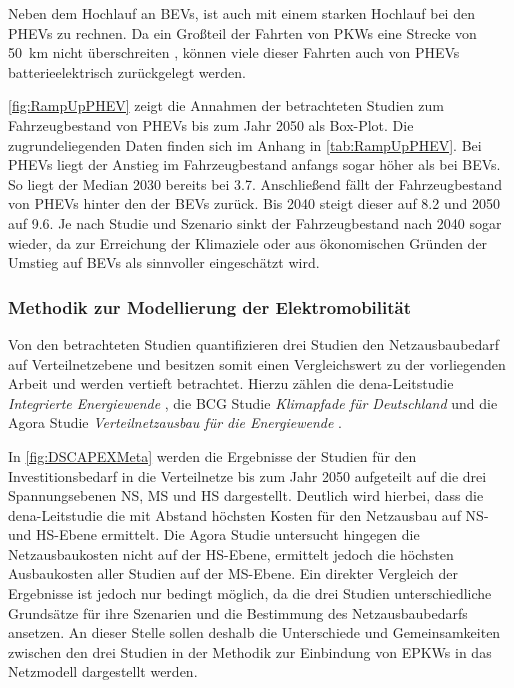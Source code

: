 Neben dem Hochlauf an \glspl{BEV}, ist auch mit einem starken Hochlauf bei den \glspl{PHEV} zu rechnen.
Da ein Großteil der Fahrten von \glspl{PKW} eine Strecke von \SI{50}{\km} nicht überschreiten \cite{Agora2019}, können viele dieser Fahrten auch von \glspl{PHEV} batterieelektrisch zurückgelegt werden.



\autoref{fig:RampUpPHEV} zeigt die Annahmen der betrachteten Studien zum Fahrzeugbestand von \glspl{PHEV} bis zum Jahr \num{2050} als Box-Plot.
Die zugrundeliegenden Daten finden sich im Anhang in \autoref{tab:RampUpPHEV}.
Bei \glspl{PHEV} liegt der Anstieg im Fahrzeugbestand anfangs sogar höher als bei \glspl{BEV}.
So liegt der Median 2030 bereits bei \SI{3.7}{\MioFZs}.
Anschließend fällt der Fahrzeugbestand von \glspl{PHEV} hinter den der \glspl{BEV} zurück.
Bis \num{2040} steigt dieser auf \SI{8.2}{\Mio} und \num{2050} auf \SI{9.6}{\MioStk}.
Je nach Studie und Szenario sinkt der Fahrzeugbestand nach \num{2040} sogar wieder, da zur Erreichung der Klimaziele oder aus ökonomischen Gründen der Umstieg auf \glspl{BEV} als sinnvoller eingeschätzt wird.


\subsubsection{Methodik zur Modellierung der Elektromobilität}

Von den betrachteten Studien quantifizieren drei Studien den Netzausbaubedarf auf Verteilnetzebene und besitzen somit einen Vergleichswert zu der vorliegenden Arbeit und werden vertieft betrachtet.
Hierzu zählen die dena-Leitstudie \textit{Integrierte Energiewende} \cite{DEAGH2018}, die BCG Studie \textit{Klimapfade für Deutschland} \cite{BCG2018} und die Agora Studie \textit{Verteilnetzausbau für die Energiewende} \cite{Agora2019}.



In \autoref{fig:DSCAPEXMeta} werden die Ergebnisse der Studien für den Investitionsbedarf in die Verteilnetze bis zum Jahr \num{2050} aufgeteilt auf die drei Spannungsebenen \gls{NS}, \gls{MS} und \gls{HS} dargestellt.
Deutlich wird hierbei, dass die dena-Leitstudie die mit Abstand höchsten Kosten für den Netzausbau auf \gls{NS}- und \gls{HS}-Ebene ermittelt.
Die Agora Studie untersucht hingegen die Netzausbaukosten nicht auf der \gls{HS}-Ebene, ermittelt jedoch die höchsten Ausbaukosten aller Studien auf der \gls{MS}-Ebene.
Ein direkter Vergleich der Ergebnisse ist jedoch nur bedingt möglich, da die drei Studien unterschiedliche Grundsätze für ihre Szenarien und die Bestimmung des Netzausbaubedarfs ansetzen.
An dieser Stelle sollen deshalb die Unterschiede und Gemeinsamkeiten zwischen den drei Studien in der Methodik zur Einbindung von \glspl{EPKW} in das Netzmodell dargestellt werden.



